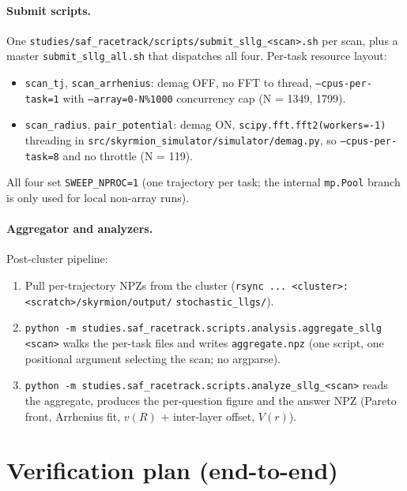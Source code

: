 \documentclass[11pt,a4paper]{article}
\begin{document}
\paragraph{Submit scripts.} One \texttt{studies/saf\_racetrack/scripts/submit\_sllg\_<scan>.sh}
per scan, plus a master \texttt{submit\_sllg\_all.sh} that dispatches
all four. Per-task resource layout:
\begin{itemize}[leftmargin=2em, nosep]
    \item \texttt{scan\_tj}, \texttt{scan\_arrhenius}: demag OFF, no
    FFT to thread, \texttt{--cpus-per-task=1} with
    \texttt{--array=0-N\%1000} concurrency cap (N = 1349, 1799).
    \item \texttt{scan\_radius}, \texttt{pair\_potential}: demag ON,
    \texttt{scipy.fft.fft2(workers=-1)} threading in
    \texttt{src/skyrmion\_simulator/simulator/demag.py}, so
    \texttt{--cpus-per-task=8} and no throttle (N = 119).
\end{itemize}
All four set \texttt{SWEEP\_NPROC=1} (one trajectory per task; the
internal \texttt{mp.Pool} branch is only used for local non-array
runs).

\paragraph{Aggregator and analyzers.} Post-cluster pipeline:
\begin{enumerate}[leftmargin=2em, nosep]
    \item Pull per-trajectory NPZs from the cluster
    (\texttt{rsync ... <cluster>:<scratch>/skyrmion/output/}
    \texttt{stochastic\_llgs/}).
    \item \texttt{python -m studies.saf\_racetrack.scripts.analysis.aggregate\_sllg <scan>} walks
    the per-task files and writes
    \texttt{aggregate.npz} (one script, one positional argument
    selecting the scan; no argparse).
    \item \texttt{python -m studies.saf\_racetrack.scripts.analyze\_sllg\_<scan>} reads
    the aggregate, produces the per-question figure and the
    answer NPZ (Pareto front, Arrhenius fit, $v(R)$ +
    inter-layer offset, $V(r)$).
\end{enumerate}

\section{Verification plan (end-to-end)}
\end{document}
